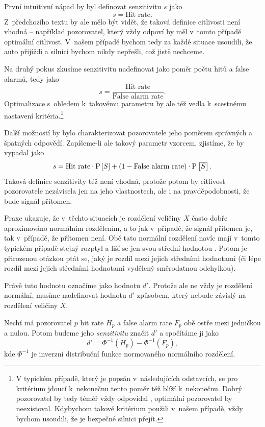 První intuitivní nápad by byl definovat senzitivitu $s$ jako $$s=\text{Hit rate}.$$
Z~předchozího textu by ale mělo být vidět, že
taková definice citlivosti není vhodná -- například pozorovatel, který vždy odpoví
 by měl v~tomto případě optimální citlivost. V~našem případě bychom tedy za každé situace usoudili, že auto přijíždí a silnici bychom nikdy nepřešli, což jistě nechceme.

Na druhý pokus zkusíme senzitivitu nadefinovat jako poměr počtu hitů a false alarmů,
tedy jako $$s=\frac{\text{Hit rate}}{\text{False alarm rate}}.$$
Optimalizace s~ohledem k~takovému parametru by ale též vedla k~scestnému nastavení
kritéria.\footnote{V typickém případě, který je popsán v~následujících
odstavcích, se pro kritérium jdoucí k~nekonečnu tento poměr též blíží
k~nekonečnu. Dobrý pozorovatel by tedy téměř vždy odpovídal , optimální
pozorovatel by neexistoval. Kdybychom takové kritérium použili v~našem případě, vždy bychom usoudili, že je bezpečné silnici přejít.}

Další možností by bylo charakterizovat pozorovatele jeho poměrem správných
a špatných odpovědí. Zapíšeme-li ale takový parametr vzorcem, zjistíme, že by vypadal jako
$$s=\text{Hit rate}\cdot\P{S} + (1-\text{False alarm rate})\cdot\P{\overline{S}}.$$ 
Taková definice senzitivity též není vhodná, protože potom by citlivost pozorovatele
nezávisela jen na jeho vlastnostech, ale i na pravděpodobnosti, že bude signál přítomen.

Praxe ukazuje, že v~těchto situacích je rozdělení veličiny $X$ často dobře
aproximováno normálním rozdělením, a to jak v~případě, že signál přítomen je,
tak v~případě, že přítomen není. Obě tato normální rozdělení navíc mají v~tomto
typickém případě stejný rozptyl a liší se jen svou střední hodnotou \citep{SwetsSDT}. Potom je
přirozenou otázkou ptát se, jaký je rozdíl mezi jejich středními hodnotami (či lépe
rozdíl mezi jejich středními hodnotami vydělený směrodatnou odchylkou).

Právě tuto hodnotu označíme jako hodnotu $d'$. Protože ale ne vždy je rozdělení
normální, musíme nadefinovat hodnotu $d'$ způsobem, který nebude závislý na rozdělení
veličiny $X$.

\begin{definice}\label{dprime}
Nechť má pozorovatel $p$ hit rate $H_p$ a false alarm rate $F_p$ obě ostře mezi jedničkou a nulou. Potom budeme jeho \emph{senzitivitu}
značit $d'$ a spočítáme ji jako $$d' = \Phi^{-1}(H_p) - \Phi^{-1}(F_p),$$ kde $\Phi^{-1}$ je inverzní distribuční funkce normovaného normálního rozdělení.
\end{definice}



